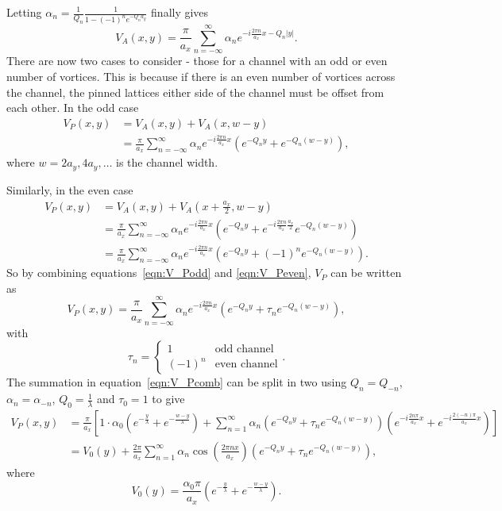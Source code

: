 \documentclass{article}
\numberwithin{equation}{section}
\begin{document}
Letting $\alpha_n = \frac{1}{Q_n}\frac{1}{1-(-1)^ne^{-Q_na_y}}$ finally gives
\begin{equation}
    V_A(x, y) = \frac{\pi}{a_x}\sum_{n=-\infty}^\infty\alpha_n e^{-i\frac{2\pi n}{a_x}x-Q_n|y|}.
\end{equation}
There are now two cases to consider - those for a channel with an odd or even number of vortices. This is because if there is an even number of vortices across the channel, the pinned lattices either side of the channel must be offset from each other.
In the odd case
\begin{align}
    V_P(x, y) &= V_A(x, y) + V_A(x, w-y) \nonumber \\
    &= \frac{\pi}{a_x}\sum_{n=-\infty}^\infty\alpha_n e^{-i\frac{2\pi n}{a_x}x} \left(e^{-Q_ny}+e^{-Q_n(w-y)}\right), \label{eqn:V_Podd}
\end{align}
where $w = 2a_y, 4a_y, \ldots$ is the channel width.

Similarly, in the even case
\begin{align}
    V_P(x, y) &= V_A(x, y) + V_A(x+\frac{a_x}{2}, w-y) \nonumber \\
    &= \frac{\pi}{a_x}\sum_{n=-\infty}^\infty\alpha_n e^{-i\frac{2\pi n}{a_x}x} \left(e^{-Q_ny}+e^{-i\frac{2\pi n}{a_x}\frac{a_x}{2}}e^{-Q_n(w-y)}\right) \nonumber \\
    &= \frac{\pi}{a_x}\sum_{n=-\infty}^\infty\alpha_n e^{-i\frac{2\pi n}{a_x}x} \left(e^{-Q_ny}+(-1)^ne^{-Q_n(w-y)}\right). \label{eqn:V_Peven}
\end{align}
So by combining equations~\ref{eqn:V_Podd} and \ref{eqn:V_Peven}, $V_P$ can be written as
\begin{equation}
    V_P(x, y) = \frac{\pi}{a_x}\sum_{n=-\infty}^\infty\alpha_n e^{-i\frac{2\pi n}{a_x}x} \left(e^{-Q_ny}+\tau_ne^{-Q_n(w-y)}\right), \label{eqn:V_Pcomb}
\end{equation}
with
\begin{equation}
    \tau_n = \left\{
    \begin{array}{ll}
        1 & \textrm{odd channel} \\
        (-1)^n & \textrm{even channel}
    \end{array}
    \right ..
\end{equation}
The summation in equation~\ref{eqn:V_Pcomb} can be split in two using $Q_n = Q_{-n}$, $\alpha_n = \alpha_{-n}$, $Q_0 = \frac{1}{\lambda}$ and $\tau_0 = 1$ to give
\begin{align}
    V_P(x, y) &= \frac{\pi}{a_x} \left[1\cdot\alpha_0\left(e^{-\frac{y}{\lambda}}+e^{-\frac{w-y}{\lambda}}\right) +\sum_{n=1}^\infty\alpha_n\left(e^{-Q_ny}+\tau_ne^{-Q_n(w-y)}\right) \left(e^{-i\frac{2n\pi}{a_x}x}+e^{-i\frac{2(-n)\pi}{a_x}x}\right) \right] \nonumber \\
    &= V_0(y) + \frac{2\pi}{a_x}\sum_{n=1}^\infty\alpha_n\cos\left(\frac{2\pi nx}{a_x}\right) \left(e^{-Q_ny}+\tau_ne^{-Q_n(w-y)}\right),
\end{align}
where
\begin{equation}
    V_0(y) = \frac{\alpha_0\pi}{a_x}\left(e^{-\frac{y}{\lambda}}+e^{-\frac{w-y}{\lambda}}\right).
\end{equation}
\end{document}
